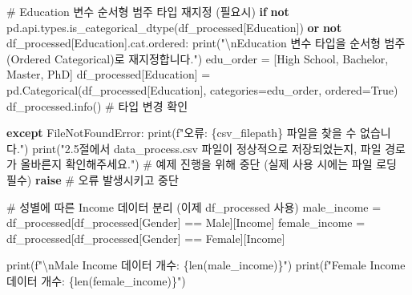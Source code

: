 \documentclass[
  letterpaper,
]{book}
\newenvironment{Shaded}{\begin{snugshade}}{\end{snugshade}}
\newcommand{\BuiltInTok}[1]{\textcolor[rgb]{0.00,0.23,0.31}{#1}}
\newcommand{\CharTok}[1]{\textcolor[rgb]{0.13,0.47,0.30}{#1}}
\newcommand{\CommentTok}[1]{\textcolor[rgb]{0.37,0.37,0.37}{#1}}
\newcommand{\ControlFlowTok}[1]{\textcolor[rgb]{0.00,0.23,0.31}{\textbf{#1}}}
\newcommand{\KeywordTok}[1]{\textcolor[rgb]{0.00,0.23,0.31}{\textbf{#1}}}
\newcommand{\NormalTok}[1]{\textcolor[rgb]{0.00,0.23,0.31}{#1}}
\newcommand{\OperatorTok}[1]{\textcolor[rgb]{0.37,0.37,0.37}{#1}}
\newcommand{\PreprocessorTok}[1]{\textcolor[rgb]{0.68,0.00,0.00}{#1}}
\newcommand{\SpecialCharTok}[1]{\textcolor[rgb]{0.37,0.37,0.37}{#1}}
\newcommand{\SpecialStringTok}[1]{\textcolor[rgb]{0.13,0.47,0.30}{#1}}
\newcommand{\StringTok}[1]{\textcolor[rgb]{0.13,0.47,0.30}{#1}}
\newcommand{\VariableTok}[1]{\textcolor[rgb]{0.07,0.07,0.07}{#1}}
\begin{document}
\begin{Shaded}
\begin{Highlighting}[]
    \CommentTok{\# Education 변수 순서형 범주 타입 재지정 (필요시)}
    \ControlFlowTok{if} \KeywordTok{not}\NormalTok{ pd.api.types.is\_categorical\_dtype(df\_processed[}\StringTok{\textquotesingle{}Education\textquotesingle{}}\NormalTok{]) }\KeywordTok{or} \KeywordTok{not}\NormalTok{ df\_processed[}\StringTok{\textquotesingle{}Education\textquotesingle{}}\NormalTok{].cat.ordered:}
        \BuiltInTok{print}\NormalTok{(}\StringTok{"}\CharTok{\textbackslash{}n}\StringTok{Education 변수 타입을 순서형 범주(Ordered Categorical)로 재지정합니다."}\NormalTok{)}
\NormalTok{        edu\_order }\OperatorTok{=}\NormalTok{ [}\StringTok{\textquotesingle{}High School\textquotesingle{}}\NormalTok{, }\StringTok{\textquotesingle{}Bachelor\textquotesingle{}}\NormalTok{, }\StringTok{\textquotesingle{}Master\textquotesingle{}}\NormalTok{, }\StringTok{\textquotesingle{}PhD\textquotesingle{}}\NormalTok{]}
\NormalTok{        df\_processed[}\StringTok{\textquotesingle{}Education\textquotesingle{}}\NormalTok{] }\OperatorTok{=}\NormalTok{ pd.Categorical(df\_processed[}\StringTok{\textquotesingle{}Education\textquotesingle{}}\NormalTok{], categories}\OperatorTok{=}\NormalTok{edu\_order, ordered}\OperatorTok{=}\VariableTok{True}\NormalTok{)}
\NormalTok{        df\_processed.info() }\CommentTok{\# 타입 변경 확인}

\ControlFlowTok{except} \PreprocessorTok{FileNotFoundError}\NormalTok{:}
    \BuiltInTok{print}\NormalTok{(}\SpecialStringTok{f"오류: \textquotesingle{}}\SpecialCharTok{\{}\NormalTok{csv\_filepath}\SpecialCharTok{\}}\SpecialStringTok{\textquotesingle{} 파일을 찾을 수 없습니다."}\NormalTok{)}
    \BuiltInTok{print}\NormalTok{(}\StringTok{"2.5절에서 \textquotesingle{}data\_process.csv\textquotesingle{} 파일이 정상적으로 저장되었는지, 파일 경로가 올바른지 확인해주세요."}\NormalTok{)}
    \CommentTok{\# 예제 진행을 위해 중단 (실제 사용 시에는 파일 로딩 필수)}
    \ControlFlowTok{raise} \CommentTok{\# 오류 발생시키고 중단}

\CommentTok{\# 성별에 따른 Income 데이터 분리 (이제 df\_processed 사용)}
\NormalTok{male\_income }\OperatorTok{=}\NormalTok{ df\_processed[df\_processed[}\StringTok{\textquotesingle{}Gender\textquotesingle{}}\NormalTok{] }\OperatorTok{==} \StringTok{\textquotesingle{}Male\textquotesingle{}}\NormalTok{][}\StringTok{\textquotesingle{}Income\textquotesingle{}}\NormalTok{]}
\NormalTok{female\_income }\OperatorTok{=}\NormalTok{ df\_processed[df\_processed[}\StringTok{\textquotesingle{}Gender\textquotesingle{}}\NormalTok{] }\OperatorTok{==} \StringTok{\textquotesingle{}Female\textquotesingle{}}\NormalTok{][}\StringTok{\textquotesingle{}Income\textquotesingle{}}\NormalTok{]}

\BuiltInTok{print}\NormalTok{(}\SpecialStringTok{f"}\CharTok{\textbackslash{}n}\SpecialStringTok{Male Income 데이터 개수: }\SpecialCharTok{\{}\BuiltInTok{len}\NormalTok{(male\_income)}\SpecialCharTok{\}}\SpecialStringTok{"}\NormalTok{)}
\BuiltInTok{print}\NormalTok{(}\SpecialStringTok{f"Female Income 데이터 개수: }\SpecialCharTok{\{}\BuiltInTok{len}\NormalTok{(female\_income)}\SpecialCharTok{\}}\SpecialStringTok{"}\NormalTok{)}
\end{Highlighting}
\end{Shaded}
\end{document}
